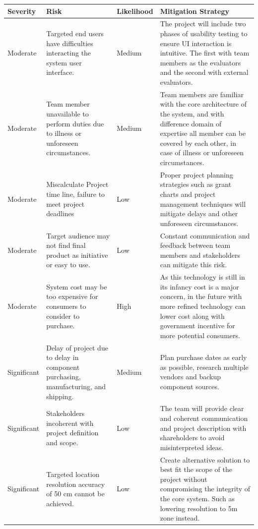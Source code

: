 \bgroup
\def\arraystretch{1.5}
\begin{table}[H]
\centering
\def\arraystretch{1.3}
\begin{tabular}{ | m{1.6cm} | m{4cm}| m{2cm} | m{7.4cm}|}
\hline
\rowcolor{lightgray} \textbf{Severity} & \textbf{Risk} & \textbf{Likelihood} & \textbf{Mitigation Strategy}\\
\hline
Moderate & Targeted end users have difficulties interacting the system user interface. & Medium & The project will include two phases of usability testing to ensure UI interaction is intuitive. The first with team members as the evaluators and the second with external evaluators. \\
\hline
Moderate & Team member unavailable to perform duties due to illness or unforeseen circumstances. & Medium & Team members are familiar with the core architecture of the system, and with difference domain of expertise all member can be covered by each other, in case of illness or unforeseen circumstances. \\
\hline
Moderate & Miscalculate Project time line, failure to meet project deadlines & Low & Proper project planning strategies such as grant charts and project management techniques will mitigate delays and other unforeseen circumstances. \\
\hline
Moderate & Target audience may not find final product as initiative or easy to use. & Low & Constant communication and feedback between team members and stakeholders can mitigate this risk. \\
\hline
Moderate & System cost may be too expensive for consumers to consider to purchase. & High & As this technology is still in its infancy cost is a major concern, in the future with more refined technology can lower cost along with government incentive for more potential consumers. \\
\hline
Significant & Delay of project due to delay in component purchasing, manufacturing, and shipping. & Medium & Plan purchase dates as early as possible, research multiple vendors and backup component sources. \\
\hline
Significant & Stakeholders incoherent with project definition and scope. & Low & The team will provide clear and coherent communication and project description with shareholders to avoid misinterpreted ideas. \\
\hline
Significant & Targeted location resolution accuracy of 50 cm cannot be achieved. & Low & Create alternative solution to best fit the scope of the project without compromising the integrity of the core system. Such as lowering resolution to 5m zone instead.\\

\end{tabular}
\end{table}
